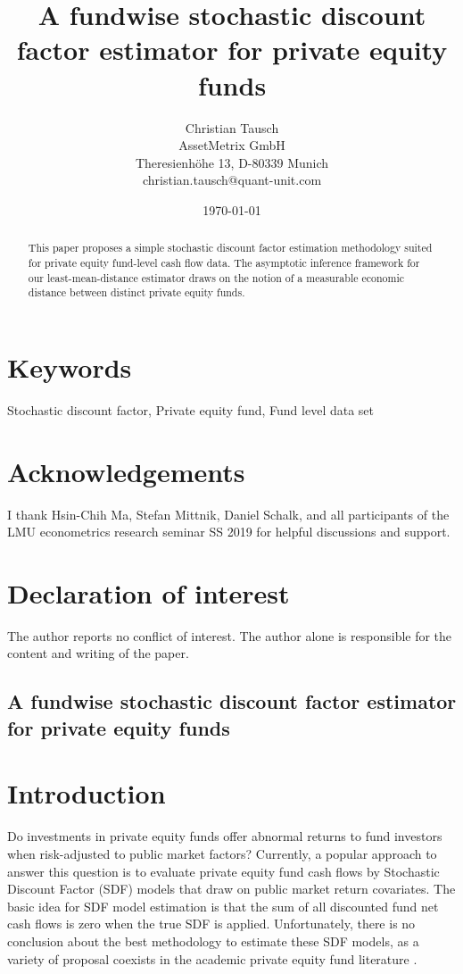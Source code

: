\documentclass[12pt]{article}
\title{A fundwise stochastic discount factor estimator for private equity funds}
\author{
	Christian Tausch  \\
	AssetMetrix GmbH  \\
	Theresienh\"{o}he 13, D-80339 Munich \\
	christian.tausch@quant-unit.com \\
	}
\date{\today}
\begin{document}
\maketitle


\section*{Keywords}
Stochastic discount factor, Private equity fund, Fund level data set


\section*{Acknowledgements}
I thank Hsin-Chih Ma, Stefan Mittnik, Daniel Schalk, and all participants of the LMU econometrics research seminar SS 2019 for helpful discussions and support.


\section*{Declaration of interest}
The author reports no conflict of interest. 
The author alone is responsible for the content and writing of the paper.


\newpage

\begin{center} 
\section*{A fundwise stochastic discount factor estimator for private equity funds}
\end{center}



\begin{abstract}
This paper proposes a simple stochastic discount factor estimation methodology suited for private equity fund-level cash flow data.
The asymptotic inference framework for our least-mean-distance estimator draws on the notion of a measurable economic distance between distinct private equity funds.
\end{abstract}

\section{Introduction}
Do investments in private equity funds offer abnormal returns to fund investors when risk-adjusted to public market factors?
Currently, a popular approach to answer this question is to evaluate private equity fund cash flows by Stochastic Discount Factor (SDF) models that draw on public market return covariates.
The basic idea for SDF model estimation is that the sum of all discounted fund net cash flows is zero when the true SDF is applied.
Unfortunately, there is no conclusion about the best methodology to estimate these SDF models, as a variety of proposal coexists in the academic private equity fund literature \citep{DLP12,KN16,ACGP18,GSW19}.
\end{document}
